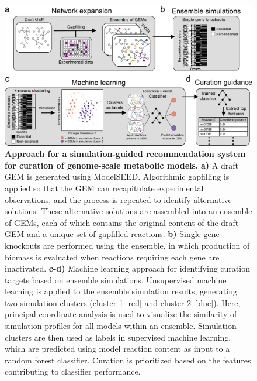 \documentclass[11pt,twocolumn,notitlepage,openany,twoside]{book}
\begin{document}
\begin{refsection}
\begin{figure}[tb]
\centering
\includegraphics[width=\textwidth]{ch3_fig1}
\caption[ Approach for a simulation-guided recommendation system for curation of genome-scale metabolic models.]{\textbf{ Approach for a simulation-guided recommendation system for curation of genome-scale metabolic models.} \textbf{a)} A draft GEM is generated using ModelSEED. Algorithmic gapfilling is applied so that the GEM can recapitulate experimental observations, and the process is repeated to identify alternative solutions. These alternative solutions are assembled into an ensemble of GEMs, each of which contains the original content of the draft GEM and a unique set of gapfilled reactions. \textbf{b)} Single gene knockouts are performed using the ensemble, in which production of biomass is evaluated when reactions requiring each gene are inactivated. \textbf{c-d)} Machine learning approach for identifying curation targets based on ensemble simulations. Unsupervised machine learning is applied to the ensemble simulation results, generating two simulation clusters (cluster 1 [red] and cluster 2 [blue]). Here, principal coordinate analysis is used to visualize the similarity of simulation profiles for all models within an ensemble. Simulation clusters are then used as labels in supervised machine learning, which are predicted using model reaction content as input to a random forest classifier. Curation is prioritized based on the features contributing to classifier performance.}
\end{figure}


\end{refsection}
\end{document}
